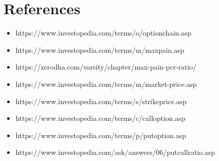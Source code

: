\hypertarget{references}{%
\section{References}\label{references}}

\begin{itemize}
\tightlist
\item
  https://www.investopedia.com/terms/o/optionchain.asp
\item
  https://www.investopedia.com/terms/m/maxpain.asp
\item
  https://zerodha.com/varsity/chapter/max-pain-pcr-ratio/
\item
  https://www.investopedia.com/terms/m/market-price.asp
\item
  https://www.investopedia.com/terms/s/strikeprice.asp
\item
  https://www.investopedia.com/terms/c/calloption.asp
\item
  https://www.investopedia.com/terms/p/putoption.asp
\item
  https://www.investopedia.com/ask/answers/06/putcallratio.asp
\end{itemize}
